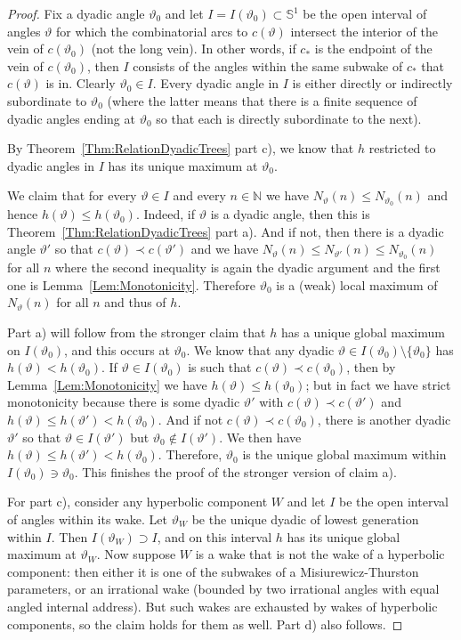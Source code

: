 \documentclass[12pt]{amsart}
\newcommand{\N}{\mathbb N}
\newcommand{\Circle}{\mathbb S^1}
\newcommand{\sm}{\setminus}
\newcommand{\0}{\texttt{0}}
\newcommand{\1}{\texttt{1}}
\theoremstyle{definition}
\numberwithin{equation}{section}
\renewcommand{\theta}{\vartheta}
\begin{document}
\begin{proof}
Fix a dyadic angle $\theta_0$ and let $I=I(\theta_0)\subset\Circle$ be the open interval of angles $\theta$ for which the combinatorial arcs to $c(\theta)$ intersect the interior of the vein of $c(\theta_0)$ (not the long vein). In other words, if $c_*$ is the endpoint of the vein of $c(\theta_0)$, then $I$ consists of the angles within the same subwake of $c_*$ that $c(\theta)$ is in. Clearly $\theta_0\in I$. Every dyadic angle in $I$ is either directly or indirectly subordinate to $\theta_0$ (where the latter means that there is a finite sequence of dyadic angles ending at $\theta_0$ so that each is directly subordinate to the next). 

By Theorem~\ref{Thm:RelationDyadicTrees} part c), we know that $h$ restricted to dyadic angles in $I$ has its unique maximum at $\theta_0$. 

We claim that for every $\theta\in I$ and every $n\in\N$ we have $N_\theta(n)\le N_{\theta_0}(n)$ and hence $h(\theta)\le h(\theta_0)$. Indeed, if $\theta$ is a dyadic angle, then this is Theorem~\ref{Thm:RelationDyadicTrees} part a). And if not, then there is a dyadic angle $\theta'$ so that $c(\theta)\prec c(\theta')$ and we have $N_\theta(n)\le N_{\theta'}(n)\le N_{\theta_0}(n)$ for all $n$ where the second inequality is again the dyadic argument and the first one is Lemma~\ref{Lem:Monotonicity}.  
Therefore $\theta_0$ is a (weak) local maximum of $N_\theta(n)$ for all $n$ and thus of $h$.

Part a) will follow from the stronger claim that $h$ has a unique global maximum on $I(\theta_0)$, and this occurs at $\theta_0$. We know that any dyadic $\theta\in I(\theta_0)\sm\{\theta_0\}$ has $h(\theta)<h(\theta_0)$. 
If $\theta\in I(\theta_0)$ is such that $c(\theta)\prec c(\theta_0)$, then by Lemma~\ref{Lem:Monotonicity} we have $h(\theta)\le h(\theta_0)$; but in fact we have strict monotonicity because there is some dyadic $\theta'$ with $c(\theta)\prec c(\theta')$ and $h(\theta)\le h(\theta')<h(\theta_0)$. 
And if not $c(\theta)\prec c(\theta_0)$, there is another dyadic $\theta'$ so that $\theta\in I(\theta')$ but $\theta_0\not\in I(\theta')$. We then have $h(\theta)\le h(\theta')<h(\theta_0)$. Therefore, $\theta_0$ is the unique global maximum within $I(\theta_0)\ni\theta_0$. This finishes the proof of the stronger version of claim a).

For part c), consider any hyperbolic component $W$ and let $I$ be the open interval of angles within its wake. Let $\theta_W$ be the unique dyadic of lowest generation within $I$. Then $I(\theta_W)\supset I$, and on this interval $h$ has its unique global maximum at $\theta_W$. Now suppose $W$ is a wake that is not the wake of a hyperbolic component: then either it is one of the subwakes of a Misiurewicz-Thurston parameters, or an irrational wake (bounded by two irrational angles with equal angled internal address). But such wakes are exhausted by wakes of hyperbolic components, so the claim holds for them as well. Part d) also follows.



\end{proof}
\end{document}
